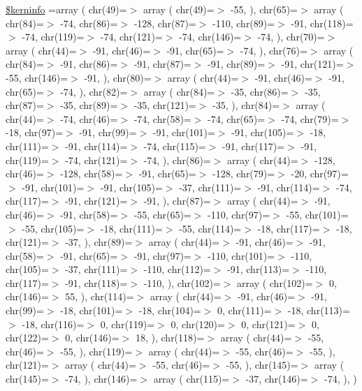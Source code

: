 \begin{DoxyCompactItemize}
\hyperlink{ctimesb_8php_ab4bb7d3b0332c517f6a42a1924f01000}{\$kerninfo} =array ( chr(49)=$>$ array ( chr(49)=$>$ -\/55, ), chr(65)=$>$ array ( chr(84)=$>$ -\/74, chr(86)=$>$ -\/128, chr(87)=$>$ -\/110, chr(89)=$>$ -\/91, chr(118)=$>$ -\/74, chr(119)=$>$ -\/74, chr(121)=$>$ -\/74, chr(146)=$>$ -\/74, ), chr(70)=$>$ array ( chr(44)=$>$ -\/91, chr(46)=$>$ -\/91, chr(65)=$>$ -\/74, ), chr(76)=$>$ array ( chr(84)=$>$ -\/91, chr(86)=$>$ -\/91, chr(87)=$>$ -\/91, chr(89)=$>$ -\/91, chr(121)=$>$ -\/55, chr(146)=$>$ -\/91, ), chr(80)=$>$ array ( chr(44)=$>$ -\/91, chr(46)=$>$ -\/91, chr(65)=$>$ -\/74, ), chr(82)=$>$ array ( chr(84)=$>$ -\/35, chr(86)=$>$ -\/35, chr(87)=$>$ -\/35, chr(89)=$>$ -\/35, chr(121)=$>$ -\/35, ), chr(84)=$>$ array ( chr(44)=$>$ -\/74, chr(46)=$>$ -\/74, chr(58)=$>$ -\/74, chr(65)=$>$ -\/74, chr(79)=$>$ -\/18, chr(97)=$>$ -\/91, chr(99)=$>$ -\/91, chr(101)=$>$ -\/91, chr(105)=$>$ -\/18, chr(111)=$>$ -\/91, chr(114)=$>$ -\/74, chr(115)=$>$ -\/91, chr(117)=$>$ -\/91, chr(119)=$>$ -\/74, chr(121)=$>$ -\/74, ), chr(86)=$>$ array ( chr(44)=$>$ -\/128, chr(46)=$>$ -\/128, chr(58)=$>$ -\/91, chr(65)=$>$ -\/128, chr(79)=$>$ -\/20, chr(97)=$>$ -\/91, chr(101)=$>$ -\/91, chr(105)=$>$ -\/37, chr(111)=$>$ -\/91, chr(114)=$>$ -\/74, chr(117)=$>$ -\/91, chr(121)=$>$ -\/91, ), chr(87)=$>$ array ( chr(44)=$>$ -\/91, chr(46)=$>$ -\/91, chr(58)=$>$ -\/55, chr(65)=$>$ -\/110, chr(97)=$>$ -\/55, chr(101)=$>$ -\/55, chr(105)=$>$ -\/18, chr(111)=$>$ -\/55, chr(114)=$>$ -\/18, chr(117)=$>$ -\/18, chr(121)=$>$ -\/37, ), chr(89)=$>$ array ( chr(44)=$>$ -\/91, chr(46)=$>$ -\/91, chr(58)=$>$ -\/91, chr(65)=$>$ -\/91, chr(97)=$>$ -\/110, chr(101)=$>$ -\/110, chr(105)=$>$ -\/37, chr(111)=$>$ -\/110, chr(112)=$>$ -\/91, chr(113)=$>$ -\/110, chr(117)=$>$ -\/91, chr(118)=$>$ -\/110, ), chr(102)=$>$ array ( chr(102)=$>$ 0, chr(146)=$>$ 55, ), chr(114)=$>$ array ( chr(44)=$>$ -\/91, chr(46)=$>$ -\/91, chr(99)=$>$ -\/18, chr(101)=$>$ -\/18, chr(104)=$>$ 0, chr(111)=$>$ -\/18, chr(113)=$>$ -\/18, chr(116)=$>$ 0, chr(119)=$>$ 0, chr(120)=$>$ 0, chr(121)=$>$ 0, chr(122)=$>$ 0, chr(146)=$>$ 18, ), chr(118)=$>$ array ( chr(44)=$>$ -\/55, chr(46)=$>$ -\/55, ), chr(119)=$>$ array ( chr(44)=$>$ -\/55, chr(46)=$>$ -\/55, ), chr(121)=$>$ array ( chr(44)=$>$ -\/55, chr(46)=$>$ -\/55, ), chr(145)=$>$ array ( chr(145)=$>$ -\/74, ), chr(146)=$>$ array ( chr(115)=$>$ -\/37, chr(146)=$>$ -\/74, ), )
\end{DoxyCompactItemize}


